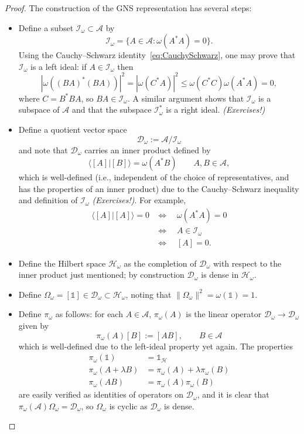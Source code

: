 \documentclass[12pt]{article}
\newcommand{\1}{\mathds{1}}                         %
\newcommand{\HH}{{\mathcal{H}}}
\newcommand{\DD}{{\mathscr{D}}}
\newcommand{\II}{{\mathbb{1}}}
\newcommand{\Ac}{{\mathcal{A}}}
\newcommand{\Ic}{{\mathcal{I}}}
\newcommand{\ip}[2]{\langle #1|#2\rangle}
\begin{document}
\begin{proof}
	The construction of the GNS representation has several steps:
	\begin{itemize}
		\item Define a subset $\Ic_\omega\subset \Ac$ by 
		\[
		\Ic_\omega = \{A\in\Ac: \omega(A^*A)=0\}.
		\]
		Using the Cauchy--Schwarz identity~\eqref{eq:CauchySchwarz}, one may prove that $\Ic_\omega$ is a left ideal: if $A\in\Ic_\omega$ then
		\[
		|\omega((BA)^*(BA))|^2 = |\omega(C^*A)|^2\le \omega(C^*C)\omega(A^*A) = 0,
		\]
		where $C=B^*BA$, 
		so $BA\in\Ic_\omega$. A similar argument shows that $\Ic_\omega$ is a subspace of $\Ac$ and that
		the subspace $\Ic_\omega^*$ is a right ideal. \emph{(Exercises!)}
		\item Define a quotient vector space
		\[
		\DD_\omega :=\Ac/\Ic_\omega
		\]
		and note that $\DD_\omega$ carries an inner product defined by 
		\[
		\ip{[A]}{[B]} = \omega(A^*B) \qquad A,B\in\Ac,
		\]
		which is well-defined (i.e., independent of the choice of representatives, and has the properties of an inner product) due to the Cauchy--Schwarz inequality and definition of $\Ic_\omega$ \emph{(Exercises!)}. For example,
		\begin{align*}
		\ip{[A]}{[A]} = 0 & \iff\quad \omega(A^*A)=0 \\
		&\iff\quad A\in\Ic_\omega \\
		& \iff\quad[A]=0.
		\end{align*}
		\item Define the Hilbert space $\HH_\omega$ as the completion of $\DD_\omega$ with respect to the inner product just mentioned; by construction $\DD_\omega$ is dense in $\HH_\omega$. 
		\item Define $\Omega_\omega = [\II]\in\DD_\omega\subset\HH_\omega$, noting that
		$\|\Omega_\omega\|^2 = \omega(\II) = 1$.
		\item Define $\pi_\omega$ as follows: for each $A\in\Ac$, $\pi_\omega(A)$ is the linear operator $\DD_\omega\to\DD_\omega$ given by 
		\[
		\pi_\omega(A)[B] := [AB],\qquad B\in\Ac
		\]
		which is well-defined due to the left-ideal property yet again.
		The properties
		\begin{align*}
		\pi_\omega(\II) &= \II_\HH   \\
		\pi_\omega(A+\lambda B) &= \pi_\omega(A)+ \lambda\pi_\omega(B) \\
		\pi_\omega(AB) &= \pi_\omega(A)\pi_\omega(B) 
		\end{align*}
		are easily verified as identities of operators on $\DD_\omega$, and
		it is clear that $\pi_\omega(\Ac)\Omega_\omega=\DD_\omega$, so $\Omega_\omega$ is cyclic as $\DD_\omega$ is dense.
		

\end{itemize}
\end{proof}
\end{document}
